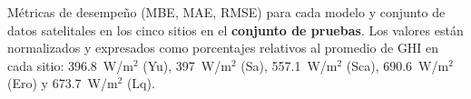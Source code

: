 \documentclass[letterpaper,12pt, twoside]{report}
\providecommand{\DIFdeltex}[1]{{\protect\color{red} \scriptsize #1}} %
\providecommand{\DIFdelFL}[1]{\DIFdel{#1}} %
\providecommand{\DIFdel}[1]{\texorpdfstring{\DIFdeltex{#1}}{}} %
\begin{document}
{%
\DIFdelFL{Métricas de desempeño (MBE, MAE, RMSE) para cada modelo y conjunto de datos satelitales en los cinco sitios en el \textbf{conjunto de pruebas}. 
   }%
\DIFdelFL{Los valores están normalizados y expresados como porcentajes relativos al promedio de GHI en cada sitio: 
           396.8~W/m$^{2}$ (Yu), 397~W/m$^{2}$ (Sa), 557.1~W/m$^{2}$ (Sca), 690.6~W/m$^{2}$ (Ero) y 673.7~W/m$^{2}$ (Lq).}}
\end{document}
